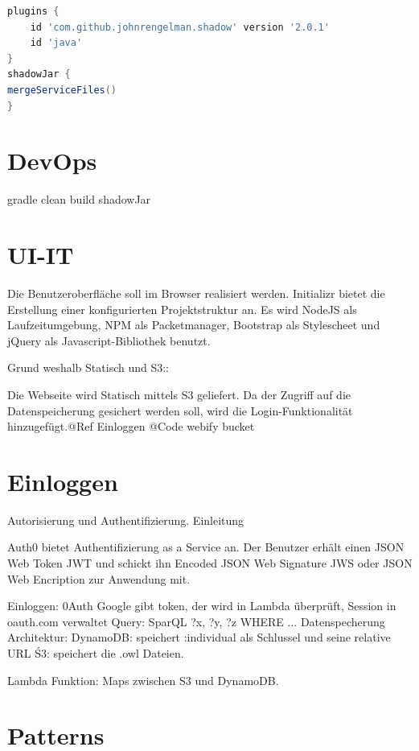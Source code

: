 \documentclass[
12pt,
english,
ngerman,
headsepline,
twoside,
openright,
numbers=noenddot,version=first
]{scrreprt}
\begin{document}
\begin{lstlisting}[language=Groovy,caption={Abhängigkeitenverwaltung für Lambda in Java},label={lst:gradle}]
plugins {
	id 'com.github.johnrengelman.shadow' version '2.0.1'
	id 'java'
}
shadowJar {
mergeServiceFiles()
}

\end{lstlisting}


\section{DevOps}
gradle clean build shadowJar


\section{UI-IT}

Die Benutzeroberfläche soll im Browser realisiert werden. Initializr bietet die Erstellung einer konfigurierten Projektstruktur an. Es wird NodeJS als Laufzeitumgebung, NPM als Packetmanager, Bootstrap als Stylescheet und jQuery als Javascript-Bibliothek benutzt.

Grund weshalb Statisch und S3::

Die Webseite wird Statisch mittels S3 geliefert. Da der Zugriff auf die Datenspeicherung gesichert werden soll, wird die Login-Funktionalität hinzugefügt.@Ref Einloggen
@Code webify bucket



\section{Einloggen}

Autorisierung und Authentifizierung. Einleitung

Auth0 bietet Authentifizierung as a Service an. Der Benutzer erhält einen JSON Web Token JWT und schickt ihn Encoded JSON Web Signature JWS oder JSON Web Encription zur Anwendung mit.


Einloggen: 0Auth Google gibt token, der wird in Lambda überprüft, Session in oauth.com verwaltet
Query: SparQL ?x, ?y, ?z WHERE ...
Datenspecherung Architektur:
DynamoDB: speichert :individual als Schlussel und seine relative URL
Ś3: speichert die .owl Dateien.

Lambda Funktion: Maps zwischen S3 und DynamoDB.

\section{Patterns}
\end{document}
